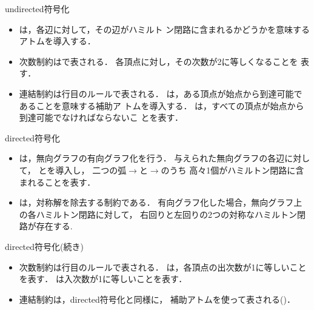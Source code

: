 \documentclass[dvipdfmx,10pt]{beamer}
\begin{document}
\begin{frame}{\textsf{undirected}符号化}
\begin{exampleblock}{}

\end{exampleblock}
\begin{itemize}
\item {}は，各辺に対して，その辺がハミルト
      ン閉路に含まれるかどうかを意味するアトムを導入する．
\item 次数制約はで表される．
      各頂点に対し，その次数が2に等しくなることを
      表す．
\item 連結制約は行目のルールで表される．
      は，ある頂点が始点から到達可能であることを意味する補助ア
      トムを導入する．
      は，すべての頂点が始点から到達可能でなければならないこ
      とを表す．
\end{itemize}
\end{frame}
\begin{frame}{\textsf{directed}符号化}
\begin{exampleblock}{}

\end{exampleblock}
\begin{itemize}
\item {}は，無向グラフの有向グラフ化を行う．
      与えられた無向グラフの各辺に対して，
      とを導入し，
      二つの弧$\rightarrow$と$\rightarrow$のうち
      高々1個がハミルトン閉路に含まれることを表す．
\item {}は，対称解を除去する制約である．
      有向グラフ化した場合，無向グラフ上の各ハミルトン閉路に対して，
      右回りと左回りの2つの対称なハミルトン閉路が存在する.
\end{itemize}
\end{frame}
\begin{frame}{\textsf{directed}符号化(続き)}
\begin{exampleblock}{}

\end{exampleblock}
\begin{itemize}
\item 次数制約は行目のルールで表される．
      は，各頂点の出次数が1に等しいことを表す．
      は入次数が1に等しいことを表す．
\item 連結制約は，\textsf{directed}符号化と同様に，
      補助アトムを使って表される()．
\end{itemize}
\end{frame}
\end{document}
